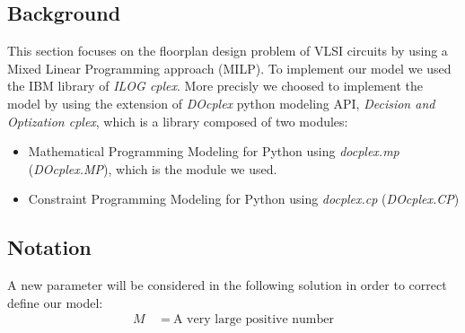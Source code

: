 
\subsection{Background}
    This section focuses on the floorplan design problem of VLSI circuits by using a Mixed Linear
    Programming approach (MILP). To implement our model we used the IBM library of 
    \textit{ILOG cplex}. More precisly we choosed to implement the model by using the extension of
    \textit{DOcplex} python modeling API, \textit{Decision and Optization cplex}, which is a 
    library composed of two modules:
    \begin{itemize}
        \item Mathematical Programming Modeling for Python using \textit{docplex.mp}
              (\textit{DOcplex.MP}), which is the module we used.
        \item Constraint Programming Modeling for Python using \textit{docplex.cp} (\textit{DOcplex.CP})
    \end{itemize}

\subsection{Notation}
    A new parameter will be considered in the following solution in order to correct define our model:
    \begin{align*}
        M\        &\ =\ \text{A very large positive number}
    \end{align*}

